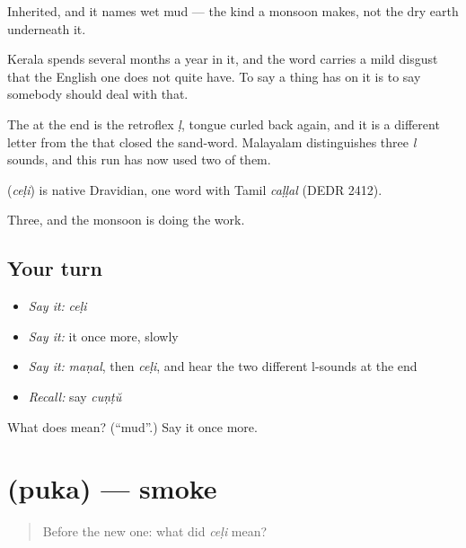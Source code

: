 Inherited, and it names wet mud — the kind a monsoon makes, not the dry earth underneath it.

Kerala spends several months a year in it, and the word carries a mild disgust that the English one does not quite have. To say a thing has  on it is to say somebody should deal with that.

The  at the end is the retroflex \emph{ḷ}, tongue curled back again, and it is a different letter from the  that closed the sand-word. Malayalam distinguishes three \emph{l} sounds, and this run has now used two of them.

\begin{cousinweb}
\textbf{} (\emph{ceḷi}) is native Dravidian, one word with Tamil \emph{caḷḷal} (DEDR 2412).
\end{cousinweb}

\begin{grammarlens}[title={What you've built}]
Three, and the monsoon is doing the work.
\end{grammarlens}

\subsection*{Your turn}
\begin{itemize}
\raggedright
  \item \emph{Say it:} \emph{ceḷi}
  \item \emph{Say it:} it once more, slowly
  \item \emph{Say it:} \emph{maṇal}, then \emph{ceḷi}, and hear the two different l-sounds at the end
  \item \emph{Recall:} say \emph{cuṇṭŭ}
\end{itemize}

\begin{tcolorbox}[breakable,colback=teal!4,colframe=teal!35!black,title={Before you move on}]
What does  mean? (\textquotedblleft{}mud\textquotedblright{}.) Say it once more.
\end{tcolorbox}
\section[\texorpdfstring{\ml{പുക} (puka)}{പുക (puka)}]{ (puka) — smoke}

\label{lesson:ML-C59-smoke}



\begin{quote}
Before the new one: what did \emph{ceḷi} mean?
\end{quote}

